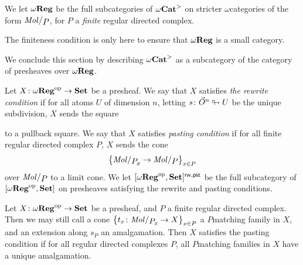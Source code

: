\begin{dfn}
    We let \( \omega\mathbf{Reg} \) be the full subcategories of \( {\omega\mathbf{Cat}}^> \) on stricter \( \omega \)\nbd categories of the form \( \molecin{P} \), for \( P \) a \emph{finite} regular directed complex.
\end{dfn}

\begin{comm}
    The finiteness condition is only here to ensure that \( \omega\mathbf{Reg} \) is a small category. 
\end{comm}

\noindent We conclude this section by describing \( {\omega\mathbf{Cat}}^> \) as a subcategory of the category of presheaves over \( \omega\mathbf{Reg} \).

\begin{dfn} 
    Let \( X \colon \omega\mathbf{Reg}^\mathrm{op} \to \mathbf{Set} \) be a presheaf. 
    We say that \( X \) satisfies \emph{the rewrite condition} if for all atoms \( U \) of dimension \( n \), letting \( s \colon \vec{O}^{n} \looparrowright U \) be the unique subdivision, \( X \) sends the square
    \begin{center}
    \end{center}
    to a pullback square.
    We say that \( X \) satisfies \emph{pasting condition} if for all finite regular directed complex \( P \), \( X \) sends the cone 
    \begin{equation*}
        \set{\molecin{\imel{P}{x}} \to \molecin{P}}_{x \in P}
    \end{equation*}
    over \( \molecin{P} \) to a limit cone.
    We let \( [\omega\mathbf{Reg}^\mathrm{op}, \mathbf{Set}]^{\mathsf{rw, pst}} \) be the full subcategory of \( [\omega\mathbf{Reg}^\mathrm{op}, \mathbf{Set}] \) on presheaves satisfying the rewrite and pasting conditions.
\end{dfn}

\begin{rmk}
    Let \( X \colon \omega\mathbf{Reg}^\mathrm{op} \to \mathbf{Set} \) be a presheaf, and \( P \) a finite regular directed complex. 
    Then we may still call a cone \( \set{t_x \colon \molecin{\imel{P}{x}} \to X}_{x \in P} \) a \( P \)\nbd matching family in \( X \), and an extension along \( s_P \) an amalgamation.
    Then \( X \) satisfies the pasting condition if for all regular directed complexes \( P \), all \( P \)\nbd matching families in \( X \) have a unique amalgamation.
\end{rmk}

